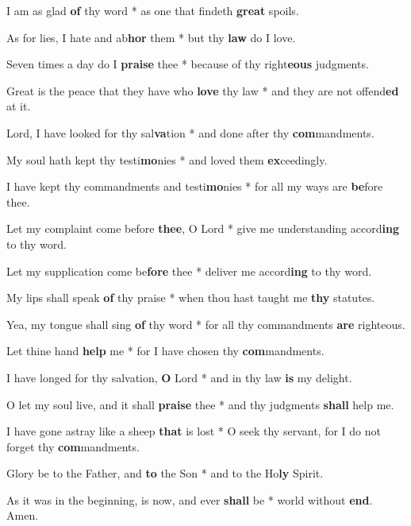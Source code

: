 \begin{multicols}{2}
	I am as glad \textbf{of} thy word * as one that findeth \textbf{great} spoils.
	
	As for lies, I hate and ab\textbf{hor} them * but thy \textbf{law} do I love.
	
	Seven times a day do I \textbf{praise} thee * because of thy right\textbf{eous} judgments.
	
	Great is the peace that they have who \textbf{love} thy law * and they are not offend\textbf{ed} at it.
	
	Lord, I have looked for thy sal\textbf{va}tion * and done after thy \textbf{com}mandments.
	
	My soul hath kept thy testi\textbf{mo}nies * and loved them \textbf{ex}ceedingly.
	
	I have kept thy commandments and testi\textbf{mo}nies * for all my ways are \textbf{be}fore thee.
	
	Let my complaint come before \textbf{thee}, O Lord * give me understanding accord\textbf{ing} to thy word.
	
	Let my supplication come be\textbf{fore} thee * deliver me accord\textbf{ing} to thy word.
	
	My lips shall speak \textbf{of} thy praise * when thou hast taught me \textbf{thy} statutes.
	
	Yea, my tongue shall sing \textbf{of} thy word * for all thy commandments \textbf{are} righteous.
	
	Let thine hand \textbf{help} me * for I have chosen thy \textbf{com}mandments.
	
	I have longed for thy salvation, \textbf{O} Lord * and in thy law \textbf{is} my delight.
	
	O let my soul live, and it shall \textbf{praise} thee * and thy judgments \textbf{shall} help me.
	
	I have gone astray like a sheep \textbf{that} is lost * O seek thy servant, for I do not forget thy \textbf{com}mandments.
	
	Glory be to the Father, and \textbf{to} the Son * and to the Ho\textbf{ly} Spirit.
	
	As it was in the beginning, is now, and ever \textbf{shall} be * world without \textbf{end}. Amen.
\end{multicols}